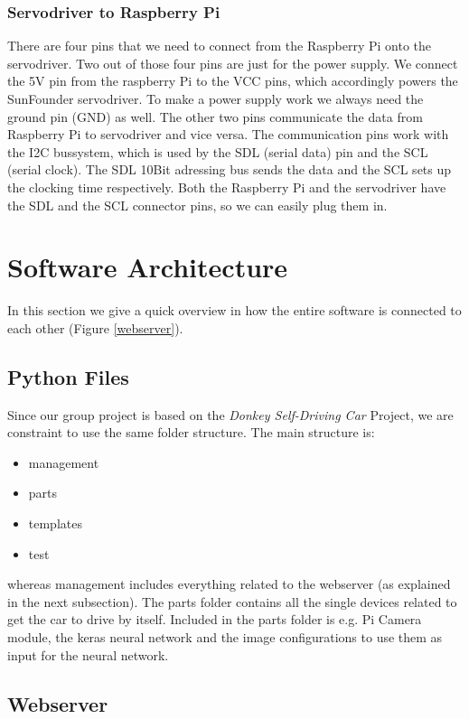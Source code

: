 \documentclass[journal]{IEEEtran}
\begin{document}
\subsubsection{Servodriver to Raspberry Pi}
There are four pins that we need to connect from the Raspberry Pi onto the servodriver. Two out of those four pins are just for the power supply. We connect the 5V pin from the raspberry Pi to the VCC pins, which accordingly powers the SunFounder servodriver. To make a power supply work we always need the ground pin (GND) as well. The other two pins communicate the data from Raspberry Pi to servodriver and vice versa. The communication pins work with the I2C bussystem, which is used by the SDL (serial data) pin and the SCL (serial clock). The SDL 10Bit adressing bus sends the data and the SCL sets up the clocking time respectively. Both the Raspberry Pi and the servodriver have the SDL and the SCL connector pins, so we can easily plug them in. 

\section{Software Architecture}

In this section we give a quick overview in how the entire software is connected to each other (Figure \ref{webserver}).

\subsection{Python Files}

Since our group project is based on the \textit{Donkey Self-Driving Car} \cite{donkey} Project,  we are constraint to use the same folder structure. The main structure is:

\begin{itemize}
\item management
\item parts
\item templates
\item test
\end{itemize}

whereas management includes everything related to the webserver (as explained in the next subsection). The parts folder contains all the single devices related to get the car to drive by itself. Included in the parts folder is e.g. Pi Camera module, the keras neural network and the image configurations to use them as input for the neural network. 

\subsection{Webserver}
\end{document}
